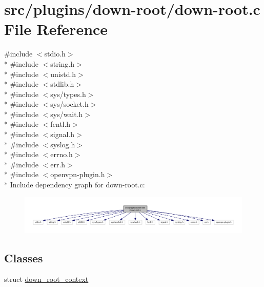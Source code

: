 \hypertarget{down-root_8c}{}\section{src/plugins/down-\/root/down-\/root.c File Reference}
\label{down-root_8c}
{\ttfamily \#include $<$stdio.\+h$>$}\\*
{\ttfamily \#include $<$string.\+h$>$}\\*
{\ttfamily \#include $<$unistd.\+h$>$}\\*
{\ttfamily \#include $<$stdlib.\+h$>$}\\*
{\ttfamily \#include $<$sys/types.\+h$>$}\\*
{\ttfamily \#include $<$sys/socket.\+h$>$}\\*
{\ttfamily \#include $<$sys/wait.\+h$>$}\\*
{\ttfamily \#include $<$fcntl.\+h$>$}\\*
{\ttfamily \#include $<$signal.\+h$>$}\\*
{\ttfamily \#include $<$syslog.\+h$>$}\\*
{\ttfamily \#include $<$errno.\+h$>$}\\*
{\ttfamily \#include $<$err.\+h$>$}\\*
{\ttfamily \#include $<$openvpn-\/plugin.\+h$>$}\\*
Include dependency graph for down-\/root.c\+:
\nopagebreak
\begin{figure}[H]
\begin{center}
\leavevmode
\includegraphics[width=350pt]{down-root_8c__incl}
\end{center}
\end{figure}
\subsection*{Classes}
\begin{DoxyCompactItemize}
\item 
struct \hyperlink{structdown__root__context}{down\+\_\+root\+\_\+context}
\end{DoxyCompactItemize}
